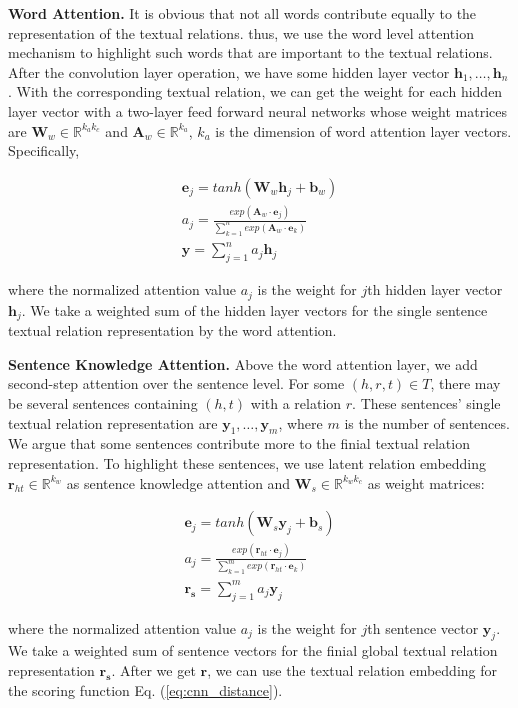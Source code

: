 \documentclass[11pt,a4paper]{article}
\begin{document}
\textbf{Word Attention.} It is obvious that not all words contribute equally to the representation of the textual relations. thus, we use the word level attention mechanism to highlight such words that are important to the textual relations. After the convolution layer operation, we have some hidden layer vector ${\mathbf{h}_1, \ldots , \mathbf{h}_n}$. With the corresponding textual relation, we can get the weight for each hidden layer vector with a two-layer feed forward neural networks whose weight matrices are $\mathbf{W}_w \in \mathbb{R}^{k_ak_c}$ and
$\mathbf{A}_w \in \mathbb{R}^{k_a}$, $k_a$ is the dimension of word attention layer vectors. Specifically,

\begin{align}
\mathbf{e}_j = tanh(\mathbf{W}_w\mathbf{h}_j+\mathbf{b}_w) \\
a_j=\frac{exp(\mathbf{A}_w\cdot\mathbf{e}_j)}{\sum_{k = 1}^{n} exp(\mathbf{A}_w\cdot\mathbf{e}_k)} \\
\mathbf{y} = \sum_{j = 1}^{n} a_j\mathbf{h}_j
\end{align}

where the normalized attention value $a_j$ is the weight for $j$th hidden layer vector $\mathbf{h}_j$. We take a weighted sum of the hidden layer vectors for the single sentence textual relation representation by the word attention.


\textbf{Sentence Knowledge Attention.} Above the word attention layer, we add second-step attention over the sentence level. For some $(h, r, t) \in T$, there may be several sentences containing $(h, t)$ with a relation $r$. These sentences' single textual relation representation are ${\mathbf{y}_1, \ldots , \mathbf{y}_m}$, where $m$ is the number of sentences. We argue that some sentences contribute more to the finial textual relation representation. To highlight these sentences, we use latent relation embedding $\mathbf{r}_{ht} \in \mathbb{R}^{k_w} $ as sentence knowledge attention and $\mathbf{W}_s \in \mathbb{R}^{k_wk_c}$ as weight matrices:

\begin{align}
\mathbf{e}_j = tanh(\mathbf{W}_s\mathbf{y}_j+\mathbf{b}_s) \\
a_j=\frac{exp(\mathbf{r}_{ht}\cdot\mathbf{e}_j)}{\sum_{k = 1}^{m} exp(\mathbf{r}_{ht}\cdot\mathbf{e}_k)} \\
\mathbf{r_s} = \sum_{j = 1}^{m} a_j\mathbf{y}_j
\end{align}

where the normalized attention value $a_j$ is the weight for $j$th sentence vector $\mathbf{y}_j$. We take a weighted sum of sentence vectors for the finial global textual relation representation $\mathbf{r_s}$. After we get $\mathbf{r}$, we can use the textual relation embedding for the scoring function Eq. (\ref{eq:cnn_distance}).
\end{document}
